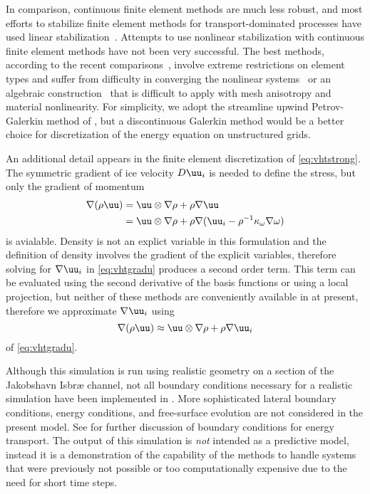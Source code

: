 In comparison, continuous finite element methods are much less robust, and most efforts to stabilize finite element methods for transport-dominated processes have used linear stabilization~\citep{brooks1982sup,hughes1989new,hughes1998variational,matthies2008stabilization}.
Attempts to use nonlinear stabilization with continuous finite element methods have not been very successful.
The best methods, according to the recent comparisons~\citep{john2007spurious,john2008spurious,john2008femtimecdr}, involve extreme restrictions on element types and suffer from difficulty in converging the nonlinear systems~\citep{mizukami1985petrov} or an algebraic construction~\citep{kuzmin2004high} that is difficult to apply with mesh anisotropy and material nonlinearity.
For simplicity, we adopt the streamline upwind Petrov-Galerkin method of \citep{brooks1982sup}, but a discontinuous Galerkin method would be a better choice for discretization of the energy equation on unstructured grids.

An additional detail appears in the finite element discretization of \eqref{eq:vhtstrong}.
The symmetric gradient of ice velocity $D\uu_i$ is needed to define the stress, but only the gradient of momentum
\begin{equation}\label{eq:vhtgradu}
  \begin{split}
    \nabla(\rho\uu) &= \uu \otimes \nabla\rho + \rho \nabla\uu \\
    &= \uu \otimes \nabla\rho + \rho \nabla (\uu_i - \rho^{-1} \kappa_\omega\nabla \omega)
  \end{split}
\end{equation}
is avialable.
Density is not an explict variable in this formulation and the definition of density involves the gradient of the explicit variables, therefore solving for $\nabla\uu_i$ in \eqref{eq:vhtgradu} produces a second order term.
This term can be evaluated using the second derivative of the basis functions or using a local projection, but neither of these methods are conveniently available in {\Dohp} at present, therefore we approximate $\nabla\uu_i$ using
\begin{equation*}
  \nabla(\rho\uu) \approx \uu \otimes \nabla\rho + \rho \nabla \uu_i
\end{equation*}
of \eqref{eq:vhtgradu}.

Although this simulation is run using realistic geometry on a section of the Jakobshavn Isbr{\ae} channel, not all boundary conditions necessary for a realistic simulation have been implemented in {\Dohp}.
More sophisticated lateral boundary conditions, energy conditions, and free-surface evolution are not considered in the present model.
See \citet{aschwanden2011enthalpy} for further discussion of boundary conditions for energy transport.
The output of this simulation is \emph{not} intended as a predictive model, instead it is a demonstration of the capability of the methods to handle systems that were previously not possible or too computationally expensive due to the need for short time steps.

